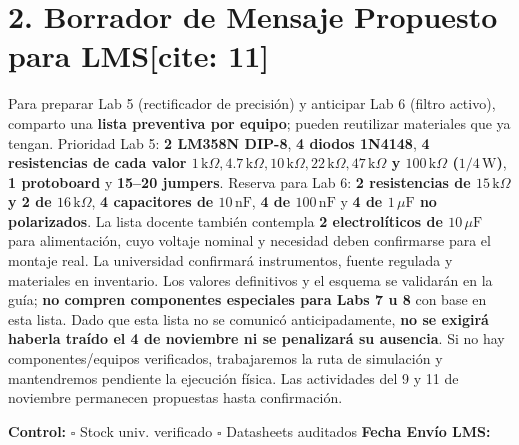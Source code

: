 \documentclass[10pt, a4paper]{article}
\begin{document}
\section*{2. Borrador de Mensaje Propuesto para LMS[cite: 11]}
\begin{tcolorbox}[colback=white, colframe=ucbblue, title=\textbf{Mensaje Propuesto (Validar antes de enviar)}]
    \small\raggedright
    Para preparar Lab 5 (rectificador de precisión) y anticipar Lab 6 (filtro activo), comparto una \textbf{lista preventiva por equipo}; pueden reutilizar materiales que ya tengan. Prioridad Lab 5: \textbf{2 LM358N DIP-8}, \textbf{4 diodos 1N4148}, \textbf{4 resistencias de cada valor $1\,\text{k}\Omega, 4.7\,\text{k}\Omega, 10\,\text{k}\Omega, 22\,\text{k}\Omega, 47\,\text{k}\Omega$ y $100\,\text{k}\Omega$ ($1/4\,\text{W}$)}, \textbf{1 protoboard} y \textbf{15–20 jumpers}. Reserva para Lab 6: \textbf{2 resistencias de $15\,\text{k}\Omega$ y 2 de $16\,\text{k}\Omega$}, \textbf{4 capacitores de $10\,\text{nF}$}, \textbf{4 de $100\,\text{nF}$} y \textbf{4 de $1\,\mu\text{F}$ no polarizados}. La lista docente también contempla \textbf{2 electrolíticos de $10\,\mu\text{F}$} para alimentación, cuyo voltaje nominal y necesidad deben confirmarse para el montaje real. La universidad confirmará instrumentos, fuente regulada y materiales en inventario. Los valores definitivos y el esquema se validarán en la guía; \textbf{no compren componentes especiales para Labs 7 u 8} con base en esta lista. Dado que esta lista no se comunicó anticipadamente, \textbf{no se exigirá haberla traído el 4 de noviembre ni se penalizará su ausencia}. Si no hay componentes/equipos verificados, trabajaremos la ruta de simulación y mantendremos pendiente la ejecución física. Las actividades del 9 y 11 de noviembre permanecen propuestas hasta confirmación.
\end{tcolorbox}
\noindent\textbf{Control:} $\square$ Stock univ. verificado \quad $\square$ Datasheets auditados \quad \textbf{Fecha Envío LMS:} \hrulefill
\end{document}
